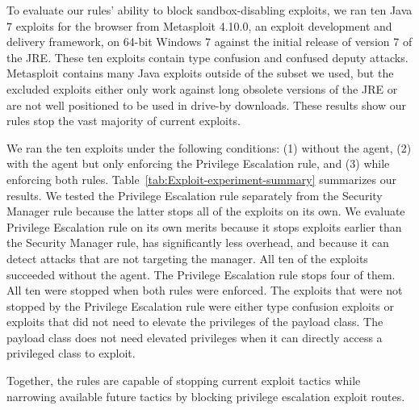 \documentclass{sig-alternate}
\begin{document}
To evaluate our rules' ability to block sandbox-disabling exploits, we ran ten
Java 7 exploits for the browser from Metasploit 4.10.0, an exploit development
and delivery framework, on 64-bit Windows 7 against the initial release of
version 7 of the JRE. These ten exploits contain type confusion and confused
deputy attacks.
Metasploit contains many Java exploits outside of the 
subset we used, but the excluded exploits either only work against long obsolete
versions of the JRE or are not well positioned to be used in drive-by
downloads.  These results show our rules stop the vast majority of 
current exploits.

We ran the ten exploits under the following conditions:
(1) without the agent, (2) with the agent but only enforcing the Privilege
Escalation rule, and (3) while enforcing both rules.   Table~\ref{tab:Exploit-experiment-summary} 
summarizes our results.  We tested the Privilege
Escalation rule separately from the Security Manager rule because the latter
stops all of the exploits on its own. We evaluate Privilege Escalation rule on
its own merits because it stops exploits earlier than the Security Manager rule,
has significantly less overhead, and because it can detect attacks that are
not targeting the manager. All  
ten of the exploits succeeded without the agent. The Privilege Escalation rule
stops four of them.  All ten were stopped
when both rules were enforced. The exploits that were not stopped
by the Privilege Escalation rule were either type confusion exploits
or exploits that did not need to elevate the privileges of the payload
class. The payload class does not need elevated privileges when it
can directly access a privileged class to
exploit.

Together, the rules are capable of stopping current exploit tactics while
narrowing available future tactics by blocking privilege escalation exploit
routes.
\end{document}
